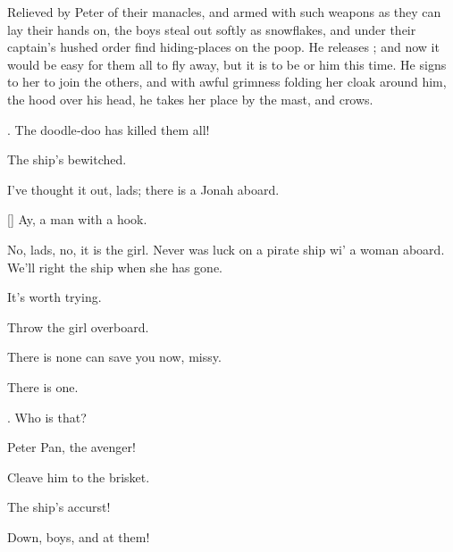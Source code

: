 \begin{drama}
{Relieved by Peter of their manacles, and armed with such weapons as they can lay their hands on,
the boys steal out softly as snowflakes, and under their captain’s hushed order find hiding‐places on the poop.
He releases \wendy; and now it would be easy for them all to fly away,
but it is to be \hook or him this time.
He signs to her to join the others,
and with awful grimness folding her cloak around him, the hood over his head,
he takes her place by the mast, and crows.}

\mullinsspeaks.
The doodle‐doo has killed them all!

The ship’s bewitched.


\hookspeaks
I’ve thought it out, lads; there is a Jonah aboard.

[]
Ay, a man with a hook.


No, lads, no, it is the girl.
Never was luck on a pirate ship wi’ a woman aboard.
We’ll right the ship when she has gone.

It’s worth trying.

\hookspeaks
Throw the girl overboard.

There is none can save you now, missy.

\peterspeaks
There is one.

\mullinsspeaks.
Who is that?

Peter Pan, the avenger!


Cleave him to the brisket.


\noodlerspeaks
The ship’s accurst!

\peterspeaks
Down, boys, and at them!



\end{drama}
